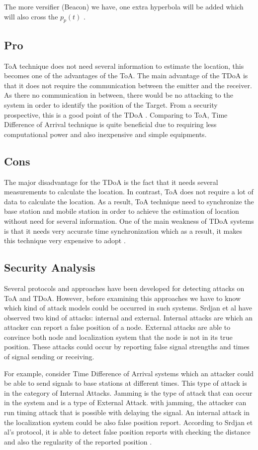 The more versifier (Beacon) we have, one extra hyperbola will be added which will also cross the $p_p(t)$ \cite{schaefer18}.

\subsection{Pro}
ToA technique does not need several information to estimate the location, this becomes one of the advantages of the ToA. The main advantage of the TDoA is that it does not require the communication between the emitter and the receiver. As there no communication in between, there would be no attacking to the system in order to identify the position of the Target. From a security prospective, this is a good point of the TDoA \cite{schaefer18}. Comparing to ToA, Time Difference of Arrival technique is quite beneficial due to requiring less computational power and also inexpensive and simple equipments.


\subsection{Cons}
The major disadvantage for the TDoA is the fact that it needs several measurements to calculate the location. In contrast, ToA does not require a lot of data to calculate the location. As a result, ToA technique need to synchronize the base station and mobile station in order to achieve the estimation of location without need for several information. One of the main weakness of TDoA systems is that it needs very accurate time synchronization which as a result, it makes this technique very expensive to adopt \cite{gante13}.

\subsection{Security Analysis}
Several protocols and approaches have been developed for detecting attacks on ToA and TDoA. However, before examining this approaches we have to know which kind of attack models could be occurred in such systems. Srdjan et al \cite{srivastava}have observed two kind of attacks: internal and external. Internal attacks are which an attacker can report a false position of a node. External attacks are able to convince both node and localization system that the node is not in its true position. These attacks could occur by reporting
false signal strengths and times of signal sending or receiving.

For example, consider Time Difference of Arrival systems which an attacker could be able to send signals to base stations at different times. This type of attack is in the category of Internal Attacks. Jamming is the type of attack that can occur in the system and is a type of External Attack. with jamming, the attacker can run timing attack that is possible with delaying the signal. An internal attack in the localization system could be also false position report. According to Srdjan et al's protocol, it is able to detect false position reports with checking the distance and also the regularity of the reported position \cite{srivastava}.

